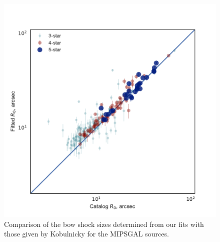 \begin{figure}
  \centering
  \includegraphics[width=\linewidth]{figs/mipsgal-r0-r0}
  \caption[]{Comparison of the bow shock sizes determined from our fits
    with those given by Kobulnicky for the MIPSGAL sources.}
  \label{fig:mipsgal-sizes}
\end{figure}


